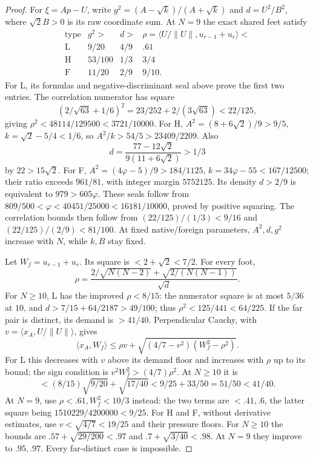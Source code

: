 \documentclass[11pt]{article}
\theoremstyle{definition}
\theoremstyle{remark}
\newcommand{\ip}[2]{\langle #1,#2\rangle}
\newcommand{\norm}[1]{\lVert #1\rVert}
\begin{document}
\begin{proof}
For \(\xi=A p-U\), write
\(g^2=(A-\sqrt k)/(A+\sqrt k)\) and \(d=U^2/B^2\),
where \(\sqrt2B>0\) is its raw coordinate sum.
At \(N=9\) the exact shared feet satisfy
\[
\begin{array}{c|c|c|c}
\text{type}&g^2>&d>&
 \rho=\ip{U/\norm U}{u_{r-1}+u_r}<\\ \hline
\mathrm L&9/20&4/9&.61\\
\mathrm H&53/100&1/3&3/4\\
\mathrm F&11/20&2/9&9/10.
\end{array}
\]
For L, its formulas and negative-discriminant seal above
prove the first two entries. The correlation numerator
has square
\[
 (2/\sqrt{63}+1/6)^2
 =23/252+2/(3\sqrt{63})<22/125,
\]
giving \(\rho^2<48114/129500<3721/10000\).
For H, \(A^2=(8+6\sqrt2)/9>9/5\),
\(k=\sqrt2-5/4<1/6\), so \(A^2/k>54/5>23409/2209\).
Also
\[
 d=\frac{77-12\sqrt2}{9(11+6\sqrt2)}>1/3
\]
by \(22>15\sqrt2\). For F,
\(A^2=(4\varphi-5)/9>184/1125\),
\(k=34\varphi-55<167/12500\); their ratio exceeds
\(961/81\), with integer margin \(5752125\).
Its density \(d>2/9\) is equivalent to
\(979>605\varphi\). These seals follow from
\(809/500<\varphi<40451/25000<16181/10000\),
proved by positive squaring.
The correlation bounds then follow from
\((22/125)/(1/3)<9/16\) and
\((22/125)/(2/9)<81/100\).
At fixed native/foreign parameters, \(A^2,d,g^2\)
increase with \(N\), while \(k,B\) stay fixed.

Let \(W_f=u_{r-1}+u_r\). Its square is
\(<2+\sqrt2<7/2\). For every foot,
\[
 \rho=\frac{2/\sqrt{N(N-2)}+
                 \sqrt{2/(N(N-1))}}{\sqrt d}.
\]
For \(N\geq10\), L has the improved \(\rho<8/15\):
the numerator square is at most \(5/36\) at \(10\),
and \(d>7/15+64/2187>49/100\);
thus \(\rho^2<125/441<64/225\).
If the far pair is distinct, its demand is \(>41/40\).
Perpendicular Cauchy, with \(v=\ip{x_A}{U/\norm U}\),
gives
\[
 \ip{x_A}{W_f}\leq
 \rho v+\sqrt{(4/7-v^2)(W_f^2-\rho^2)}.
\]
For L this decreases with \(v\) above its demand floor
and increases with \(\rho\) up to its bound; the sign
condition is \(v^2W_f^2>(4/7)\rho^2\).
At \(N\geq10\) it is
\[
 <(8/15)\sqrt{9/20}+\sqrt{17/40}
 <9/25+33/50=51/50<41/40.
\]
At \(N=9\), use \(\rho<.61,W_f^2<10/3\) instead:
the two terms are \(<.41,.6\), the latter square
being \(1510229/4200000<9/25\).
For H and F, without derivative estimates, use
\(v<\sqrt{4/7}<19/25\) and their pressure floors.
For \(N\geq10\) the bounds are
\(.57+\sqrt{29/200}<.97\) and
\(.7+\sqrt{3/40}<.98\).
At \(N=9\) they improve to \(.95,.97\).
Every far-distinct case is impossible.


\end{proof}
\end{document}
